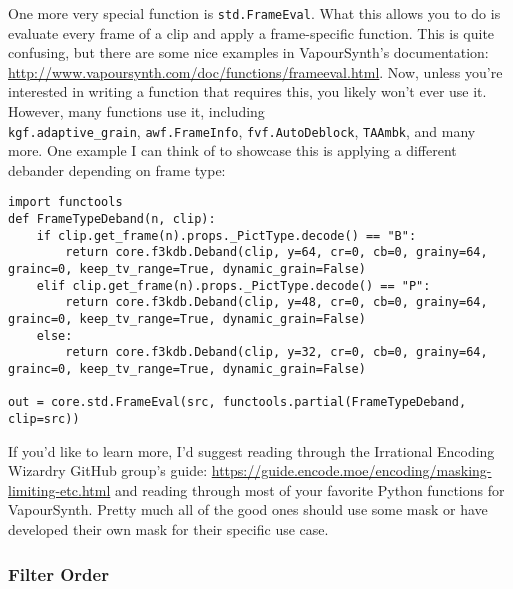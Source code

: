 \documentclass{scrartcl}
\begin{document}
One more very special function is \texttt{std.FrameEval}.  What this allows you to do is evaluate every frame of a clip and apply a frame-specific function.  This is quite confusing, but there are some nice examples in VapourSynth's documentation: \url{http://www.vapoursynth.com/doc/functions/frameeval.html}.  Now, unless you're interested in writing a function that requires this, you likely won't ever use it.  However, many functions use it, including\\ \texttt{kgf.adaptive\_grain}, \texttt{awf.FrameInfo}, \texttt{fvf.AutoDeblock}, \texttt{TAAmbk}, and many more.  One example I can think of to showcase this is applying a different debander depending on frame type:
\begin{lstlisting}
import functools
def FrameTypeDeband(n, clip):
	if clip.get_frame(n).props._PictType.decode() == "B":
		return core.f3kdb.Deband(clip, y=64, cr=0, cb=0, grainy=64, grainc=0, keep_tv_range=True, dynamic_grain=False)
	elif clip.get_frame(n).props._PictType.decode() == "P":
		return core.f3kdb.Deband(clip, y=48, cr=0, cb=0, grainy=64, grainc=0, keep_tv_range=True, dynamic_grain=False)
	else:
		return core.f3kdb.Deband(clip, y=32, cr=0, cb=0, grainy=64, grainc=0, keep_tv_range=True, dynamic_grain=False)
		
out = core.std.FrameEval(src, functools.partial(FrameTypeDeband, clip=src))
\end{lstlisting}

If you'd like to learn more, I'd suggest reading through the Irrational Encoding Wizardry GitHub group's guide: \url{https://guide.encode.moe/encoding/masking-limiting-etc.html} and reading through most of your favorite Python functions for VapourSynth.  Pretty much all of the good ones should use some mask or have developed their own mask for their specific use case.

\pagebreak

\subsubsection{Filter Order}
\end{document}
